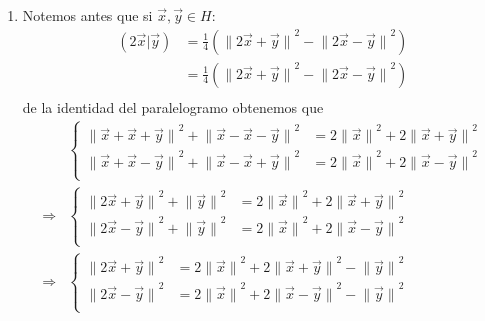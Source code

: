 \documentclass[12pt]{report}
\newcounter{it}
\theoremstyle{largebreak}
\newcommand\pint[2]{\ensuremath{\left(#1\big|#2\right)}}
\newcommand\norm[1]{\ensuremath{\|#1\|}}
\begin{document}
\begin{sol}
\begin{enumerate}
\begin{enumerate}
            \item Notemos antes que si $\vec{x},\vec{y}\in H$:
                \begin{equation*}
                    \begin{split}
                        \pint{2\vec{x}}{\vec{y}}&=\frac{1}{4}\left(\norm{2\vec{x}+\vec{y}}^2-\norm{2\vec{x}-\vec{y}}^2 \right) \\
                        &=\frac{1}{4}\left(\norm{2\vec{x}+\vec{y}}^2-\norm{2\vec{x}-\vec{y}}^2 \right) \\
                    \end{split}
                \end{equation*}
                de la identidad del paralelogramo obtenemos que
                \begin{equation*}
                    \begin{split}
                        &\left\{
                            \begin{array}{rl}
                                \norm{\vec{x}+\vec{x}+\vec{y}}^2+\norm{\vec{x}-\vec{x}-\vec{y}}^2&=2\norm{\vec{x}}^2+2\norm{\vec{x}+\vec{y}}^2\\
                                \norm{\vec{x}+\vec{x}-\vec{y}}^2+\norm{\vec{x}-\vec{x}+\vec{y}}^2&=2\norm{\vec{x}}^2+2\norm{\vec{x}-\vec{y}}^2\\
                            \end{array}
                        \right.\\
                        \Rightarrow&\left\{
                            \begin{array}{rl}
                                \norm{2\vec{x}+\vec{y}}^2+\norm{\vec{y}}^2&=2\norm{\vec{x}}^2+2\norm{\vec{x}+\vec{y}}^2\\
                                \norm{2\vec{x}-\vec{y}}^2+\norm{\vec{y}}^2&=2\norm{\vec{x}}^2+2\norm{\vec{x}-\vec{y}}^2\\
                            \end{array}
                        \right.\\
                        \Rightarrow&\left\{
                            \begin{array}{rl}
                                \norm{2\vec{x}+\vec{y}}^2&=2\norm{\vec{x}}^2+2\norm{\vec{x}+\vec{y}}^2-\norm{\vec{y}}^2\\
                                \norm{2\vec{x}-\vec{y}}^2&=2\norm{\vec{x}}^2+2\norm{\vec{x}-\vec{y}}^2-\norm{\vec{y}}^2\\

\end{array}
\end{split}
\end{equation*}
\end{enumerate}
\end{enumerate}
\end{sol}
\end{document}
